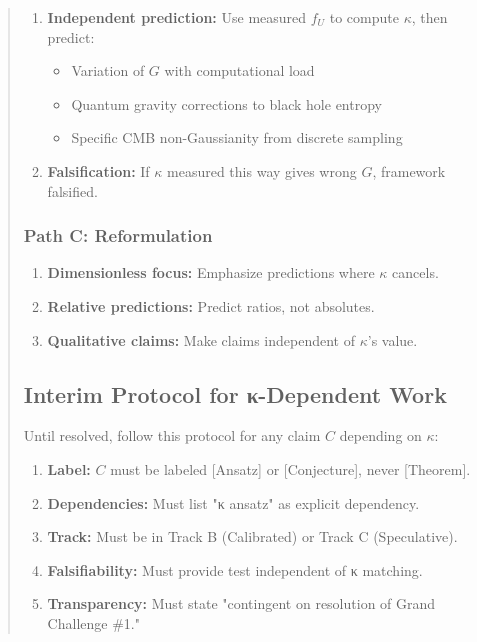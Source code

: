 \documentclass[11pt,titlepage]{article}
\begin{document}
\begin{abstract}
\begin{enumerate}
\item \textbf{Independent prediction:} Use measured $f_U$ to compute $\kappa$, then predict:
\begin{itemize}
\item Variation of $G$ with computational load
\item Quantum gravity corrections to black hole entropy
\item Specific CMB non-Gaussianity from discrete sampling
\end{itemize}

\item \textbf{Falsification:} If $\kappa$ measured this way gives wrong $G$, framework falsified.
\end{enumerate}

\subsubsection{Path C: Reformulation}
\begin{enumerate}
\item \textbf{Dimensionless focus:} Emphasize predictions where $\kappa$ cancels.
\item \textbf{Relative predictions:} Predict ratios, not absolutes.
\item \textbf{Qualitative claims:} Make claims independent of $\kappa$'s value.
\end{enumerate}

\subsection{Interim Protocol for κ-Dependent Work}

Until resolved, follow this protocol for any claim $C$ depending on $\kappa$:

\begin{tcolorbox}[colback=yellow!5!white,colframe=yellow!75!black,title=Protocol: Handling κ-Dependent Claims]
\begin{enumerate}
\item \textbf{Label:} $C$ must be labeled [Ansatz] or [Conjecture], never [Theorem].
\item \textbf{Dependencies:} Must list "κ ansatz" as explicit dependency.
\item \textbf{Track:} Must be in Track B (Calibrated) or Track C (Speculative).
\item \textbf{Falsifiability:} Must provide test independent of κ matching.
\item \textbf{Transparency:} Must state "contingent on resolution of Grand Challenge \#1."
\end{enumerate}
\end{tcolorbox}


\end{abstract}
\end{document}
